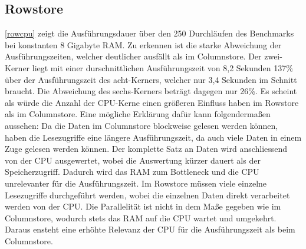 \subsection{Rowstore}

\begin{figure}[H]
\end{figure}

\autoref{rowcpu} zeigt die Ausführungsdauer über den 250 Durchläufen des Benchmarks bei konstanten 8 Gigabyte RAM. Zu erkennen ist die starke Abweichung der Ausführungszeiten, welcher deutlicher ausfällt als im Columnstore. Der zwei-Kerner liegt mit einer durschnittlichen Ausführungszeit von 8,2 Sekunden 137\% über der Ausführungszeit des acht-Kerners, welcher nur 3,4 Sekunden im Schnitt braucht. Die Abweichung des sechs-Kerners beträgt dagegen nur 26\%. 
Es scheint als würde die Anzahl der CPU-Kerne einen größeren Einfluss haben im Rowstore als im Columnstore. Eine mögliche Erklärung dafür kann folgendermaßen aussehen: 
Da die Daten im Columnstore blockweise gelesen werden können, haben die Lesezugriffe eine längere Ausführungszeit, da auch viele Daten in einem Zuge gelesen werden können. Der komplette Satz an Daten wird anschliessend von der CPU ausgewertet, wobei die Auswertung kürzer dauert als der Speicherzugriff. Dadurch wird das RAM zum Bottleneck und die CPU unrelevanter für die Ausführungszeit. 
Im Rowstore müssen viele einzelne Lesezugriffe durchgeführt werden, wobei die einzelnen Daten direkt verarbeitet werden von der CPU. Die Parallelität ist nicht in dem Maße gegeben wie im Columnstore, wodurch stets das RAM auf die CPU wartet und umgekehrt. Daraus ensteht eine erhöhte Relevanz der CPU für die Ausführungszeit als beim Columnstore. 

